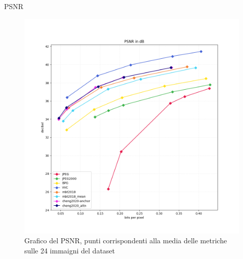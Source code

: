     \begin{frame}{PSNR}
        \begin{figure}[t!]
            \centering
            \includegraphics[width=0.65\textheight]{Immagini/METRICS/PSNR.png}
            \caption{Grafico del PSNR, punti corrispondenti alla media delle metriche sulle 24 immaigni del dataset}
            \label{fig:GraphPSNR}
        \end{figure}
    \end{frame}

